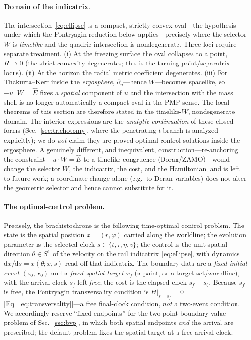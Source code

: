 \documentclass[12pt]{iopart}
\newcommand{\Ehat}{\hat E}
\newcommand{\dd}{\mathrm{d}}
\begin{document}
\paragraph{Domain of the indicatrix.} The intersection~\eqref{eq:ellipse} is a
compact, strictly convex oval---the hypothesis under which the Pontryagin reduction
below applies---precisely where the selector $W$ is \emph{timelike} and the quadric
intersection is nondegenerate. Three loci require separate treatment. (i) At the
freezing surface the oval collapses to a point, $R\to0$ (the strict convexity
degenerates; this is the turning-point/separatrix locus). (ii) At the horizon the
radial metric coefficient degenerates. (iii) For Thakurta--Kerr inside the
\emph{ergosphere}, $\partial_\eta$---hence $W$---becomes spacelike, so
$-u\cdot W=\Ehat$ fixes a \emph{spatial} component of $u$ and the intersection with
the mass shell is no longer automatically a compact oval in the PMP sense. The local
theorems of this section are therefore stated in the timelike-$W$, nondegenerate
domain. The interior expressions are the \emph{analytic continuation} of these
closed forms (Sec.~\ref{sec:trichotomy}, where the penetrating $t$-branch is analyzed
explicitly); we do \emph{not} claim they are proved optimal-control solutions inside
the ergosphere. A genuinely different, and inequivalent, construction---re-anchoring
the constraint $-u\cdot W=\Ehat$ to a timelike congruence (Doran/ZAMO)---would change
the selector $W$, the indicatrix, the cost, and the Hamiltonian, and is left to
future work; a coordinate change alone (e.g.\ to Doran variables) does not alter the
geometric selector and hence cannot substitute for it.

\paragraph{The optimal-control problem.} Precisely, the brachistochrone is the
following time-optimal control problem. The state is the spatial position
$x=(r,\varphi)$ carried along the worldline; the evolution parameter is the selected
clock $s\in\{t,\tau,\eta,v\}$; the control is the unit spatial direction $\theta\in
S^1$ of the velocity on the rail indicatrix~\eqref{eq:ellipse}, with dynamics
$\dd x/\dd s=\dot x(\theta;x,s)$ read off that indicatrix. The boundary data are a
\emph{fixed initial event} $(s_0,x_0)$ and a \emph{fixed spatial target} $x_f$ (a
point, or a target set/worldline), with the arrival clock $s_f$ left \emph{free}; the
cost is the elapsed clock $s_f-s_0$. Because $s_f$ is free, the Pontryagin
transversality condition is $H|_{s=s_f}=0$ [Eq.~\eqref{eq:transversality}]---a free
final-clock condition, \emph{not} a two-event condition. We accordingly reserve
``fixed endpoints'' for the two-point boundary-value problem of Sec.~\ref{sec:bvp}, in
which both spatial endpoints \emph{and} the arrival are prescribed; the default problem
fixes the spatial target at a free arrival clock.
\end{document}
